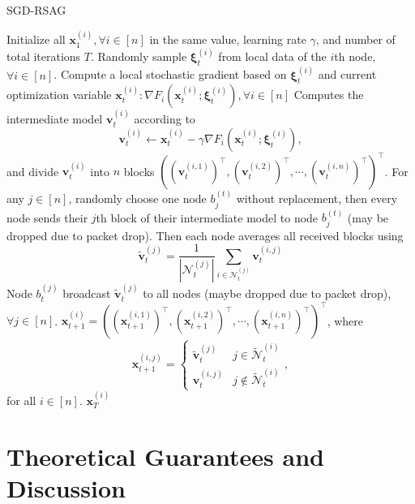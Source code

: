 \documentclass{article}
\def\rc{\color{red}}
\newcounter{thm_counter}
\begin{document}
\begin{algorithm}[t]
\scriptsize
\caption{SGD-RSAG}\label{alg1}
\begin{minipage}{1.0\linewidth}
\small
\begin{algorithmic}[1]
 {\rc Initialize all $\bm{x}^{(i)}_1, \forall i\in[n]$ in the same value, learning rate $\gamma$, and number of total iterations $T$.}
\STATE Randomly sample $\bm{\xi}^{(i)}_t$ from local data of the $i$th node, $\forall i\in[n]$.
\STATE Compute a local stochastic gradient based on $\bm{\xi}^{(i)}_t$ and current optimization variable $\bm{x}^{(i)}_t:\nabla F_i(\bm{x}^{(i)}_t;\bm{\xi}^{(i)}_t), \forall i\in[n]$
\STATE Computes the intermediate model $\bm{v}^{(i)}_t$ according to
\[
\bm{v}_{t}^{(i)}\gets \bm{x}_{t}^{(i)}-\gamma\nabla F_i(\bm{x}^{(i)}_t;\bm{\xi}^{(i)}_t),
\]
and divide $\bm{v}^{(i)}_t$ into $n$ blocks $\left(\left(\bm{v}_t^{(i,1)}\right)^{\top}, \left(\bm{v}_t^{(i,2)}\right)^{\top}, \cdots, \left(\bm{v}_t^{(i,n)}\right)^{\top}\right)^{\top}$.
\STATE For any $j\in [n]$, randomly choose one node $b_j^{(t)}$ without replacement, then every node sends their $j$th block of their intermediate model to node $b_j^{(t)}$ (may be dropped due to packet drop). Then each node {\rc averages all received blocks using}
\begin{equation*}
	\tilde{\bm{v}}_t^{(j)} = \frac{1}{|\mathcal{N}_t^{(j)}|}\sum\limits_{i\in \mathcal{N}_t^{(j)}} \bm{v}_t^{(i,j)}
\end{equation*}
\STATE Node $b_t^{(j)}$ broadcast $\tilde{\bm{v}}_t^{(j)}$ to all nodes (maybe dropped due to packet drop), $\forall j\in [n]$.
\STATE $\bm{x}_{t+1}^{(i)} = \left(\left(\bm{x}_{t+1}^{(i,1)}\right)^{\top}, \left(\bm{x}_{t+1}^{(i,2)}\right)^{\top},\cdots, \left(\bm{x}_{t+1}^{(i,n)}\right)^{\top}\right)^{\top}$, where
\begin{displaymath}
	\bm{x}_{t+1}^{(i,j)} = \left\{ \begin{array}{ll}
		\tilde{\bm{v}}_t^{(j)} & j\in \widetilde{\mathcal{N}}_t^{(i)}\\
		\bm{v}_t^{(i,j)} & j\notin \widetilde{\mathcal{N}}_t^{(i)}
	\end{array} \right. ,
\end{displaymath}
for all $i\in [n]$.
\ENDFOR
{} $\bm{x}^{(i)}_T$
\end{algorithmic}
\end{minipage}
\end{algorithm}


\section{{\rc Theoretical Guarantees} and Discussion}
\end{document}
